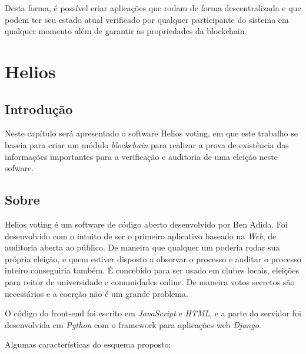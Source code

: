 \documentclass{ufsctex/ufsctex}
\begin{document}
Desta forma, é possível criar aplicações que rodam de forma descentralizada e
que podem ter seu estado atual verificado por qualquer participante do sistema
em qualquer momento além de garantir as propriedades da blockchain.

\chapter{Helios}

\section{Introdução}

Neste capítulo será apresentado o software Helios voting, em que este trabalho
se baseia para criar um módulo \textit{blockchain} para realizar a prova de
existência das informações importantes para a verificação e auditoria de uma
eleição neste sofware.

\section{Sobre}

Helios voting é um software de código aberto desenvolvido por Ben Adida. Foi
desenvolvido com o intuito de ser o primeiro aplicativo baseado na
\textit{Web}, de auditoria aberta ao público. De maneira que qualquer um
poderia rodar sua própria eleição, e quem estiver disposto a observar o
processo e auditar o processo inteiro conseguiria também. É concebido para ser
usado em clubes locais, eleições para reitor de universidade e comunidades
online. De maneira votos secretos são necessários e a coerção não é um grande
problema.\cite{benAdida}

O código do front-end foi escrito em \textit{JavaScript} e \textit{HTML}, e a
parte do servidor foi desenvolvida em \textit{Python} com o framework para
aplicações web \textit{Django}. 

Algumas características do esquema proposto:
\end{document}
